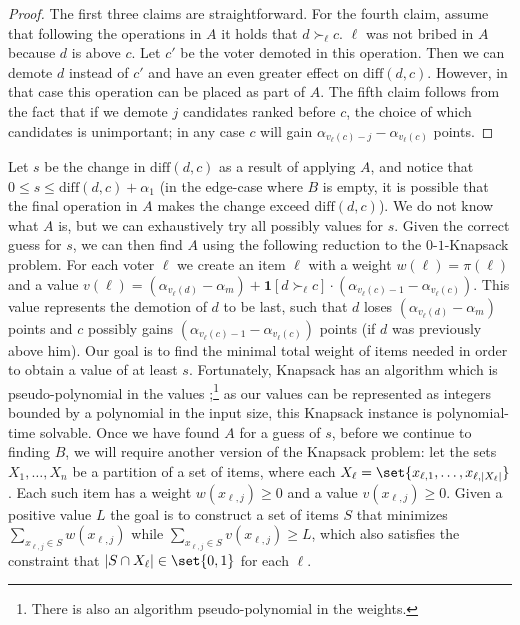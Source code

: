 \documentclass[letterpaper]{article} %
\newcommand{\indic}{\mathbf{1}}
\newcommand{\abs}[1]{\lvert{#1}\rvert}
\newcommand{\diff}{\mathrm{diff}}
\begin{document}
\begin{proof}
The first three claims are straightforward. For the fourth claim,
assume that following the operations in $A$ it holds that $d \succ_{\ell} c$. $\ell$ was not bribed in $A$ because $d$ is above $c$. Let $c'$ be the voter demoted in this operation. Then we can demote $d$ instead of $c'$ and have an even greater effect on $\diff(d, c)$. However, in that case this operation can be placed as part of $A$. The fifth claim follows from the fact that if we demote $j$ candidates ranked before $c$, the choice of which  candidates is unimportant; in any case $c$ will gain $\alpha_{v_\ell(c) - j} - \alpha_{v_\ell(c)}$ points.
\end{proof}
Let $s$ be the change in $\diff(d,c)$ as a result of applying $A$, and notice that $0 \leq s \leq \diff(d,c) + \alpha_1 $ (in the edge-case where $B$ is empty, it is possible that the final operation in $A$ makes the change exceed $\diff(d,c)$). We do not know what $A$ is, but  we can exhaustively try all possibly values for $s$. Given the correct guess for $s$, we can then find $A$ using the following reduction to the $0$-$1$-Knapsack problem.
For each voter $\ell$ we create an  item $\ell$ with a  weight $w(\ell) = \pi(\ell)$ and a value $v(\ell) = (\alpha_{v_\ell(d)} - \alpha_m) + \indic{[d \succ_\ell c]} \cdot (\alpha_{v_\ell(c) - 1} - \alpha_{v_\ell(c)})$. This value represents the demotion of  $d$ to be last, such that $d$ loses $(\alpha_{v_\ell(d)} - \alpha_m)$ points and $c$ possibly gains $ (\alpha_{v_\ell(c) - 1} - \alpha_{v_\ell(c)})$ points (if $d$ was previously above him).
Our goal is to find the minimal total weight of items needed in order to obtain a value of at least $s$. Fortunately, Knapsack has an algorithm which is pseudo-polynomial in the values \cite{cormen2009introduction};\footnote{There is also an algorithm  pseudo-polynomial in the weights.} as our values can be represented as integers bounded by a polynomial in the input size, this Knapsack instance is polynomial-time solvable.
Once we have found $A$ for a guess of $s$, before we continue to finding $B$, we will require another  version of the Knapsack problem: let the sets $X_1,\ldots,X_n$ be a partition of a set of items, where each $X_\ell = \set{x_{\ell,1},\ldots,x_{\ell,\abs{X_\ell}}} $. Each such item has a weight $w(x_{\ell,j}) \geq 0$ and a value $v(x_{\ell, j}) \geq 0$.
Given a positive value $L$ the goal is to construct a set of items $S$ that minimizes $\sum_{x_{\ell,j} \in S}{w(x_{\ell,j})}$ while $\sum_{x_{\ell,j} \in S}{v(x_{\ell,j})} \geq L$, which also satisfies  the constraint that $\abs{S \cap X_\ell}\in\set{0,1}$ for each $\ell$.
\end{document}
